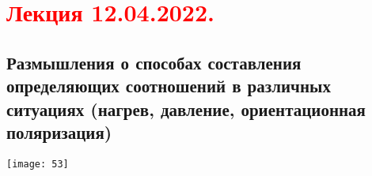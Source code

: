 \documentclass[main.tex]{subfiles}
\begin{document}
\section{\textcolor{red}{Лекция 12.04.2022.}}

\subsection{Размышления о способах составления определяющих соотношений в различных ситуациях (нагрев, давление, ориентационная поляризация)}
\texttt{[image: 53]}





\end{document}
